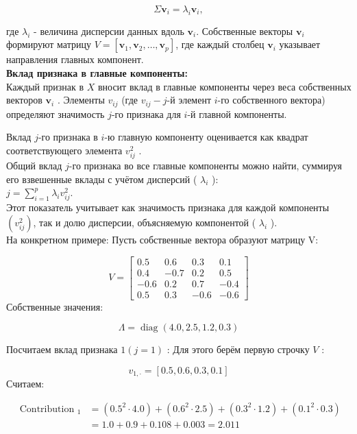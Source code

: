 $$
\Sigma \mathbf{v}_i=\lambda_i \mathbf{v}_i,
$$


где $\lambda_i$ - величина дисперсии данных вдоль $\mathbf{v}_i$.
Собственные векторы $\mathbf{v}_i$ формируют матрицу $V=\left[\mathbf{v}_1, \mathbf{v}_2, \ldots, \mathbf{v}_p\right]$, где каждый столбец $\mathbf{v}_i$ указывает направления главных компонент.\\
\textbf{Вклад признака в главные компоненты:}\\

Каждый признак в $X$ вносит вклад в главные компоненты через веса собственных векторов $\mathbf{v}_i$ . Элементы $v_{i j}$ (где $v_{i j}-j$-й элемент $i$-го собственного вектора) определяют значимость $j$-го признака для $i$-й главной компоненты.

Вклад $j$-го признака в $i$-ю главную компоненту оценивается как квадрат соответствующего элемента $v_{i j}^2$ .\\

Общий вклад $j$-го признака во все главные компоненты можно найти, суммируя его взвешенные вклады с учётом дисперсий ( $\lambda_i$ ):\\
$j=\sum_{i=1}^p \lambda_i v_{i j}^2$.\\
Этот показатель учитывает как значимость признака для каждой компоненты $\left(v_{i j}^2\right)$, так и долю дисперсии, объясняемую компонентой ( $\lambda_i$ ).\\
На конкретном примере:
Пусть собственные вектора образуют матрицу V:

$$
V=\left[\begin{array}{cccc}
0.5 & 0.6 & 0.3 & 0.1 \\
0.4 & -0.7 & 0.2 & 0.5 \\
-0.6 & 0.2 & 0.7 & -0.4 \\
0.5 & 0.3 & -0.6 & -0.6
\end{array}\right]
$$
Собственные значения:

$$
\Lambda=\operatorname{diag}(4.0,2.5,1.2,0.3)
$$

Посчитаем вклад признака $1(j=1)$ :
Для этого берём первую строчку $V$ :

$$
v_{1, \cdot}=[0.5,0.6,0.3,0.1]
$$
Считаем:

$$
\begin{aligned}
\text { Contribution }_1 & =\left(0.5^2 \cdot 4.0\right)+\left(0.6^2 \cdot 2.5\right)+\left(0.3^2 \cdot 1.2\right)+\left(0.1^2 \cdot 0.3\right) \\
& =1.0+0.9+0.108+0.003=2.011
\end{aligned}
$$

